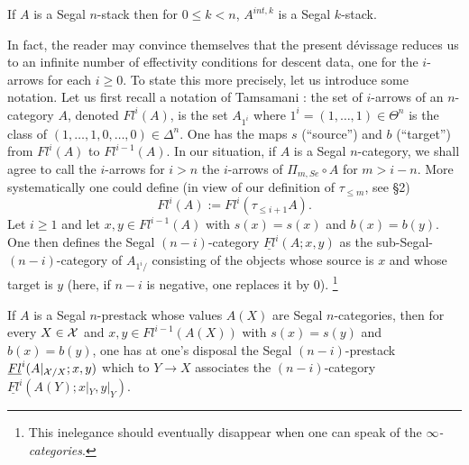 \begin{corollary}
If $A$ is a Segal $n$-stack then for $0\leq k < n$, $A^{int,k}$ is a Segal
$k$-stack.
\end{corollary}
\eop


In fact, the reader may convince themselves that the present dévissage reduces
us to an infinite number of effectivity conditions for descent data, one for
the $i$-arrows for each $i\geq 0$. To state this more precisely, let us
introduce some notation. Let us first recall a notation of Tamsamani
\cite{Tamsamani}: the set of $i$-arrows of an $n$-category $A$, denoted
$Fl^i(A)$, is the set $A_{1^i}$ where $1^i = (1,\ldots , 1)\in \Theta ^n$ is
the class of $(1,\ldots , 1,0,\ldots , 0)\in \Delta ^n$. One has the maps $s$
(``source'') and $b$ (``target'') from $Fl^i(A)$ to $Fl^{i-1}(A)$. In our
situation, if $A$ is a Segal $n$-category, we shall agree to call the
$i$-arrows for $i>n$ the $i$-arrows of $\Pi _{m,Se}\circ A$ for $m> i-n$. More
systematically one could define (in view of our definition of $\tau _{\leq m}$,
see \S 2)
$$
Fl^i(A):= Fl^i(\tau _{\leq i+1}A).
$$
Let $i\geq 1$ and let $x,y\in Fl^{i-1}(A)$ with $s(x)=s(x)$ and $b(x)=b(y)$.
One then defines the Segal $(n-i)$-category
$\underline{Fl}^i(A; x,y)$ as the sub-Segal-$(n-i)$-category of $A_{1^i/}$
consisting of the objects whose source is $x$ and whose target is $y$ (here, if
$n-i$ is negative, one replaces it by $0$).
\footnote{
This inelegance should eventually disappear when one can speak of the
{\em $\infty$-categories}.}

If $A$ is a Segal $n$-prestack whose values $A(X)$ are Segal $n$-categories,
then for every $X\in {\cal X}$ and $x,y\in Fl^{i-1}(A(X))$ with $s(x)=s(y)$ and
$b(x)=b(y)$, one has at one's disposal the Segal $(n-i)$-prestack
$\underline{Fl}^i(A|_{{\cal X} /X}; x,y)$ which to $Y\rightarrow X$ associates the
$(n-i)$-category $\underline{Fl}^i(A(Y); x|_Y,y|_Y)$.

